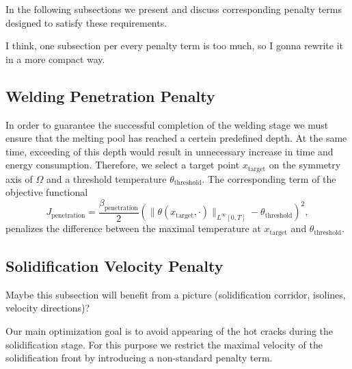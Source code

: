 In the following subsections we present and discuss corresponding penalty terms designed to satisfy these requirements.

{\color{TolHighContrastBlue}
I think, one subsection per every penalty term is too much, so I gonna rewrite it in a more compact way.
}

\subsection{Welding Penetration Penalty}



In order to guarantee the successful completion of the welding stage we must ensure that the melting pool has reached a certein predefined depth. At the same time, exceeding of this depth would result in unnecessary increase in time and energy consumption. Therefore, we select a target point $x_{\text{target}}$ on the symmetry axis of $\Omega$ and a threshold temperature $\theta_{\text{threshold}}$. The corresponding term of the objective functional
\begin{equation}
	J_{\text{penetration}} = \frac{\beta_\text{penetration}}{2} \left( \| \theta(x_{\text{target}},\cdot) \|_{L^{\infty}[0,T]} - \theta_{\text{threshold}} \right)^2,
\end{equation}
penalizes the difference between the maximal temperature at $x_{\text{target}}$ and $\theta_{\text{threshold}}$.


\subsection{Solidification Velocity Penalty}

{\color{TolHighContrastBlue}
Maybe this subsection will benefit from a picture (solidification corridor, isolines, velocity directions)?
}

Our main optimization goal is to avoid appearing of the hot cracks during the solidification stage. For this purpose we restrict the maximal velocity of the solidification front by introducing a non-standard penalty term.

